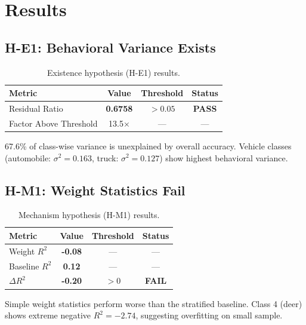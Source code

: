 \section{Results}

\subsection{H-E1: Behavioral Variance Exists}

\begin{table}[h]
\centering
\begin{tabular}{lccc}
\toprule
Metric & Value & Threshold & Status \\
\midrule
Residual Ratio & \textbf{0.6758} & $> 0.05$ & \textbf{PASS} \\
Factor Above Threshold & 13.5$\times$ & --- & --- \\
\bottomrule
\end{tabular}
\caption{Existence hypothesis (H-E1) results.}
\label{tab:he1}
\end{table}

67.6\% of class-wise variance is unexplained by overall accuracy. Vehicle classes (automobile: $\sigma^2 = 0.163$, truck: $\sigma^2 = 0.127$) show highest behavioral variance.

\subsection{H-M1: Weight Statistics Fail}

\begin{table}[h]
\centering
\begin{tabular}{lccc}
\toprule
Metric & Value & Threshold & Status \\
\midrule
Weight $R^2$ & \textbf{-0.08} & --- & --- \\
Baseline $R^2$ & \textbf{0.12} & --- & --- \\
$\Delta R^2$ & \textbf{-0.20} & $> 0$ & \textbf{FAIL} \\
\bottomrule
\end{tabular}
\caption{Mechanism hypothesis (H-M1) results.}
\label{tab:hm1}
\end{table}

Simple weight statistics perform worse than the stratified baseline. Class 4 (deer) shows extreme negative $R^2 = -2.74$, suggesting overfitting on small sample.
